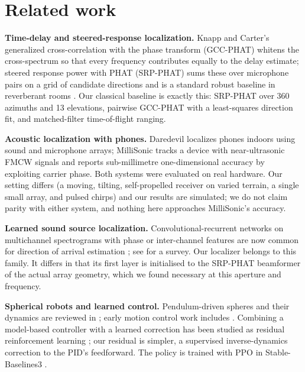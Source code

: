 \section{Related work}

\textbf{Time-delay and steered-response localization.} Knapp and Carter's generalized
cross-correlation with the phase transform (GCC-PHAT) \cite{knapp1976gcc} whitens the
cross-spectrum so that every frequency contributes equally to the delay estimate; steered
response power with PHAT (SRP-PHAT) sums these over microphone pairs on a grid of candidate
directions and is a standard robust baseline in reverberant rooms \cite{dibiase2001srp}. Our
classical baseline is exactly this: SRP-PHAT over 360 azimuths and 13 elevations, pairwise
GCC-PHAT with a least-squares direction fit, and matched-filter time-of-flight ranging.

\textbf{Acoustic localization with phones.} Daredevil \cite{constandache2014daredevil} localizes
phones indoors using sound and microphone arrays; MilliSonic \cite{wang2019millisonic} tracks a
device with near-ultrasonic FMCW signals and reports sub-millimetre one-dimensional accuracy by
exploiting carrier phase. Both systems were evaluated on real hardware. Our setting differs (a
moving, tilting, self-propelled receiver on varied terrain, a single small array, and pulsed
chirps) and our results are simulated; we do not claim parity with either system, and nothing
here approaches MilliSonic's accuracy.

\textbf{Learned sound source localization.} Convolutional-recurrent networks on multichannel
spectrograms with phase or inter-channel features are now common for direction of arrival
estimation \cite{adavanne2019seld,chakrabarty2019doa}; see \cite{grumiaux2022survey} for a survey.
Our localizer belongs to this family. It differs in that its first layer is initialised to the
SRP-PHAT beamformer of the actual array geometry, which we found necessary at this aperture and
frequency.

\textbf{Spherical robots and learned control.} Pendulum-driven spheres and their dynamics are
reviewed in \cite{chase2012spherical}; early motion control work includes
\cite{halme1996spherical}. Combining a model-based controller with a learned correction has been
studied as residual reinforcement learning \cite{johannink2019residual}; our residual is
simpler, a supervised inverse-dynamics correction to the PID's feedforward. The policy is trained
with PPO \cite{schulman2017ppo} in Stable-Baselines3 \cite{raffin2021sb3}.


